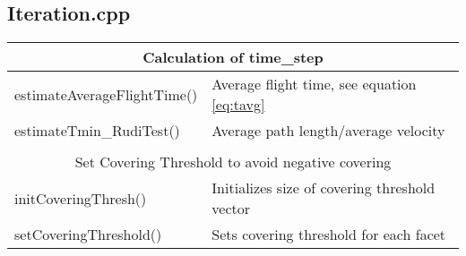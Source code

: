 \subsection{Iteration.cpp}
\begin{center}
\begin{tabular}{|l|l|}
\hline
\multicolumn{2}{|c|}{\rule{0pt}{3ex}Calculation of time\_step}\\
\hline
\rule{0pt}{3ex} estimateAverageFlightTime()& Average flight time, see equation \ref{eq:tavg}\\
\rule{0pt}{3ex} estimateTmin\_RudiTest()& Average path length/average velocity\\
\hline
\multicolumn{2}{l}{}\\[1ex]
\hline
\multicolumn{2}{|c|}{\rule{0pt}{3ex}Set Covering Threshold to avoid negative covering}\\
\hline
\rule{0pt}{3ex} initCoveringThresh()& Initializes size of covering threshold vector\\
\rule{0pt}{3ex} setCoveringThreshold()& Sets covering threshold for each facet\\
\hline
\end{tabular}
\end{center}

